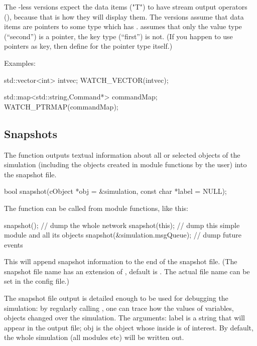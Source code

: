 The -less versions expect the data items ("T") to have
stream output operators (), because that is how
they will display them. The  versions assume that
data items are pointers to some type which has .
 assumes that only the value type (``second'')
is a pointer, the key type (``first'') is not. (If you happen to use
pointers as key, then define  for the pointer type
itself.)

Examples:

\begin{cpp}
std::vector<int> intvec;
WATCH_VECTOR(intvec);

std::map<std::string,Command*> commandMap;
WATCH_PTRMAP(commandMap);
\end{cpp}



\subsection{Snapshots}
\label{sec:ch-sim-lib:snapshots}

The  function outputs textual information about all
or selected objects of the simulation (including the objects created
in module functions by the user) into the snapshot file.

\begin{cpp}
bool snapshot(cObject *obj = &simulation, const char *label = NULL);
\end{cpp}

The function can be called from module functions, like this:

\begin{cpp}
snapshot();     // dump the whole network
snapshot(this); // dump this simple module and all its objects
snapshot(&simulation.msgQueue); // dump future events
\end{cpp}

This will append snapshot information to the end of the snapshot file.
(The snapshot file name has an extension of , default is
. The actual file name can be set in the
config file.)

The snapshot file output is detailed enough to be used for debugging
the simulation: by regularly calling , one can trace
how the values of variables, objects changed over the simulation.
The arguments: label is a string that will appear in the output
file; obj is the object whose inside is of interest. By default,
the whole simulation (all modules etc) will be written out.

